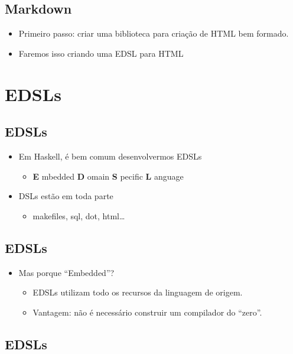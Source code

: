 \documentclass[11pt]{article}
\begin{document}
\subsection*{Markdown}
\label{sec:org1239a06}

\begin{itemize}
\item Primeiro passo: criar uma biblioteca para criação de HTML bem formado.
\item Faremos isso criando uma EDSL para HTML
\end{itemize}
\section*{EDSLs}
\label{sec:org0ff6aae}

\subsection*{EDSLs}
\label{sec:org2d226f9}

\begin{itemize}
\item Em Haskell, é bem comum desenvolvermos EDSLs
\begin{itemize}
\item \textbf{E} mbedded \textbf{D} omain \textbf{S} pecific \textbf{L} anguage
\end{itemize}
\item DSLs estão em toda parte
\begin{itemize}
\item makefiles, sql, dot, html\ldots{}
\end{itemize}
\end{itemize}
\subsection*{EDSLs}
\label{sec:org9041c8d}

\begin{itemize}
\item Mas porque ``Embedded''?
\begin{itemize}
\item EDSLs utilizam todo os recursos da linguagem de origem.
\item Vantagem: não é necessário construir um compilador do ``zero''.
\end{itemize}
\end{itemize}
\subsection*{EDSLs}
\label{sec:orgfbe8ada}
\end{document}
